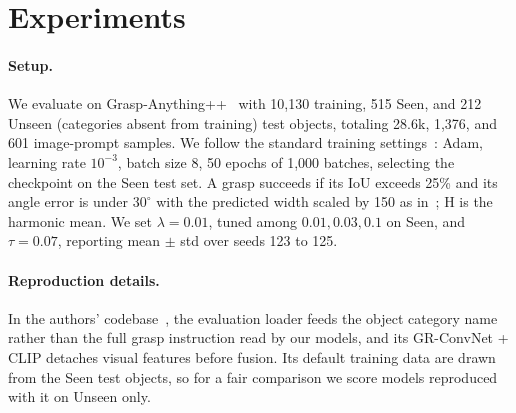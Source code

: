 \section{Experiments}
\label{sec:experiments}

\paragraph{Setup.}
We evaluate on Grasp-Anything++~\cite{vuong2024language} with 10,130 training, 515 Seen, and 212 Unseen (categories absent from training) test objects, totaling 28.6k, 1,376, and 601 image-prompt samples.
We follow the standard training settings~\cite{vuong2024language}: Adam, learning rate $10^{-3}$, batch size 8, 50 epochs of 1,000 batches, selecting the checkpoint on the Seen test set.
A grasp succeeds if its IoU exceeds 25\% and its angle error is under $30^{\circ}$ with the predicted width scaled by 150 as in~\cite{vuong2024language}; H is the harmonic mean.
We set $\lambda = 0.01$, tuned among $0.01, 0.03, 0.1$ on Seen, and $\tau = 0.07$, reporting mean $\pm$ std over seeds 123 to 125.

\paragraph{Reproduction details.}
In the authors' codebase~\cite{vuong2024language}, the evaluation loader feeds the object category name rather than the full grasp instruction read by our models, and its GR-ConvNet + CLIP detaches visual features before fusion.
Its default training data are drawn from the Seen test objects, so for a fair comparison we score models reproduced with it on Unseen only.

